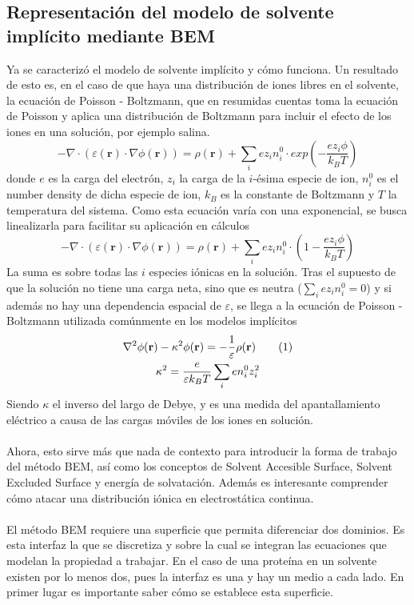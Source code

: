 \documentclass[12pt, notitlepage]{article}
\newcommand\numberthis{\addtocounter{equation}{1}\tag{\theequation}}
\numberwithin{equation}{section}
\begin{document}
\subsection{Representación del modelo de solvente implícito mediante BEM}
Ya se caracterizó el modelo de solvente implícito y cómo funciona. Un resultado de esto es, en el caso de que haya una distribución de iones libres en el solvente, la ecuación de Poisson - Boltzmann, que en resumidas cuentas toma la ecuación de Poisson y aplica una distribución de Boltzmann para incluir el efecto de los iones en una solución, por ejemplo salina.
\begin{equation}
-\nabla\cdot(\varepsilon(\mathbf{r})\cdot\nabla\phi(\mathbf{r})) = \rho(\mathbf{r}) + \sum_i ez_in_i^0\cdot exp\left(-\frac{ez_i\phi}{k_BT}\right)
\end{equation}
donde $e$ es la carga del electrón, $z_i$ la carga de la $i$-ésima especie de ion, $n_i^0$ es el number density de dicha especie de ion, $k_B$ es la constante de Boltzmann y $T$ la temperatura del sistema. Como esta ecuación varía con una exponencial, se busca linealizarla para facilitar su aplicación en cálculos
\begin{equation}
-\nabla\cdot(\varepsilon(\mathbf{r})\cdot\nabla\phi(\mathbf{r})) = \rho(\mathbf{r}) + \sum_i ez_in_i^0\cdot \left(1 - \frac{ez_i\phi}{k_BT}\right)
\end{equation}
La suma es sobre todas las $i$ especies iónicas en la solución. Tras el supuesto de que la solución no tiene una carga neta, sino que es neutra ($\sum_i ez_in_i^0 = 0$) y si además no hay una dependencia espacial de $\varepsilon$, se llega a la ecuación de Poisson - Boltzmann utilizada comúnmente en los modelos implícitos
\begin{gather*}
\nabla^2\phi(\mathbf{r}) - \kappa^2\phi(\mathbf{r}) = - \frac{1}{\varepsilon}\rho(\mathbf{r})\numberthis \\
\kappa^2 = \frac{e}{\varepsilon k_BT}\sum_i en_i^0z_i^2
\end{gather*}
Siendo $\kappa$ el inverso del largo de Debye, y es una medida del apantallamiento eléctrico a causa de las cargas móviles de los iones en solución.\\\\
Ahora, esto sirve más que nada de contexto para introducir la forma de trabajo del método BEM, así como los conceptos de Solvent Accesible Surface, Solvent Excluded Surface y energía de solvatación. Además es interesante comprender cómo atacar una distribución iónica en electrostática continua.\\\\
El método BEM requiere una superficie que permita diferenciar dos dominios. Es esta interfaz la que se discretiza y sobre la cual se integran las ecuaciones que modelan la propiedad a trabajar. En el caso de una proteína en un solvente existen por lo menos dos, pues la interfaz es una y hay un medio a cada lado. En primer lugar es importante saber cómo se establece esta superficie.
\end{document}
